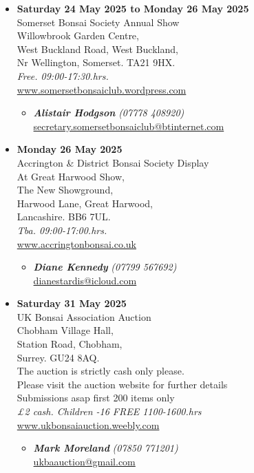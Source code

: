 \begin{itemize}
    \item \textbf{Saturday 24 May 2025 to Monday 26 May 2025}
    \\
    Somerset Bonsai Society Annual Show \\
    Willowbrook Garden Centre, \\
    West Buckland Road, West Buckland, \\
    Nr Wellington, Somerset. TA21 9HX.
    \\
    \emph{Free. 09:00-17:30.hrs.}
    \\
    \href{http://www.somersetbonsaiclub.wordpress.com/}{www.somersetbonsaiclub.wordpress.com}
    \begin{itemize}
        \item \textbf{\emph{Alistair Hodgson}} \emph{(07778 408920)} \\
        \href{mailto:secretary.somersetbonsaiclub@btinternet.com}{secretary.somersetbonsaiclub@btinternet.com} 
    \end{itemize}

    \item \textbf{Monday 26 May 2025}
    \\
    Accrington \& District Bonsai Society Display \\
    At Great Harwood Show, \\
    The New Showground, \\
    Harwood Lane, Great Harwood, \\
    Lancashire. BB6 7UL.
    \\
    \emph{Tba. 09:00-17:00.hrs.}
    \\
    \href{https://www.accringtonbonsai.co.uk}{www.accringtonbonsai.co.uk}
    \begin{itemize}
        \item \textbf{\emph{Diane Kennedy}} \emph{(07799 567692)} \\
        \href{mailto:dianestardis@icloud.com}{dianestardis@icloud.com} 
    \end{itemize}

    \item \textbf{Saturday 31 May 2025}
    \\
    UK Bonsai Association Auction \\
    Chobham Village Hall, \\
    Station Road, Chobham, \\
    Surrey. GU24 8AQ. \\
    The auction is strictly cash only please. \\
    Please visit the auction website for further details \\
    Submissions asap first 200 items only
    \\
    \emph{£2 cash. Children -16 FREE 1100-1600.hrs}
    \\
    \href{https://www.ukbonsaiauction.weebly.com}{www.ukbonsaiauction.weebly.com}
    \begin{itemize}
        \item \textbf{\emph{Mark Moreland}} \emph{(07850 771201)} \\
        \href{mailto:ukbaauction@gmail.com}{ukbaauction@gmail.com} 
    \end{itemize}


\end{itemize}
